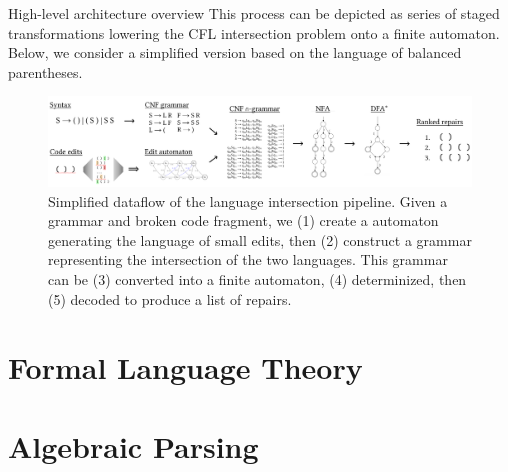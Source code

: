 \documentclass{beamer}
\begin{document}
\begin{frame}[fragile]{High-level architecture overview}
This process can be depicted as series of staged transformations lowering the CFL intersection problem onto a finite automaton. Below, we consider a simplified version based on the language of balanced parentheses.

\vspace{0.3cm}
\begin{figure}[H]
\centering
\includegraphics[width=\textwidth]{flow_short}
\vspace{0.1cm}
\caption{Simplified dataflow of the language intersection pipeline. Given a grammar and broken code fragment, we (1) create a automaton generating the language of small edits, then (2) construct a grammar representing the intersection of the two languages. This grammar can be (3) converted into a finite automaton, (4) determinized, then (5) decoded to produce a list of repairs.}
\label{fig:exampleDFA}
\end{figure}
\end{frame}

\section{Formal Language Theory}\label{sec:fltheory}


\section{Algebraic Parsing}\label{sec:algebraic-parsing}
\end{document}
